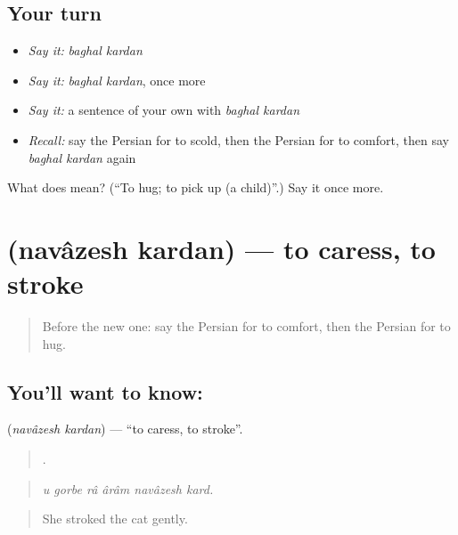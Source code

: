 \subsection*{Your turn}
\begin{itemize}
\raggedright
  \item \emph{Say it:} \emph{baghal kardan}
  \item \emph{Say it:} \emph{baghal kardan}, once more
  \item \emph{Say it:} a sentence of your own with \emph{baghal kardan}
  \item \emph{Recall:} say the Persian for to scold, then the Persian for to comfort, then say \emph{baghal kardan} again
\end{itemize}

\begin{tcolorbox}[breakable,colback=teal!4,colframe=teal!35!black,title={Before you move on}]
What does   mean? (\textquotedblleft{}To hug; to pick up (a child)\textquotedblright{}.) Say it once more.
\end{tcolorbox}
\section[\texorpdfstring{\fa{نوازش} \fa{کردن} (navâzesh kardan)}{نوازش کردن (navâzesh kardan)}]{  (navâzesh kardan) — to caress, to stroke}

\label{lesson:FA-C505-navazesh-kardan}



\begin{quote}
Before the new one: say the Persian for to comfort, then the Persian for to hug.
\end{quote}

\subsection*{You'll want to know:  }
\textbf{ } (\emph{navâzesh kardan}) — \textquotedblleft{}to caress, to stroke\textquotedblright{}.

\begin{quote}
     .
\end{quote}

\begin{quote}
\emph{u gorbe râ ârâm navâzesh kard.}
\end{quote}

\begin{quote}
She stroked the cat gently.
\end{quote}

